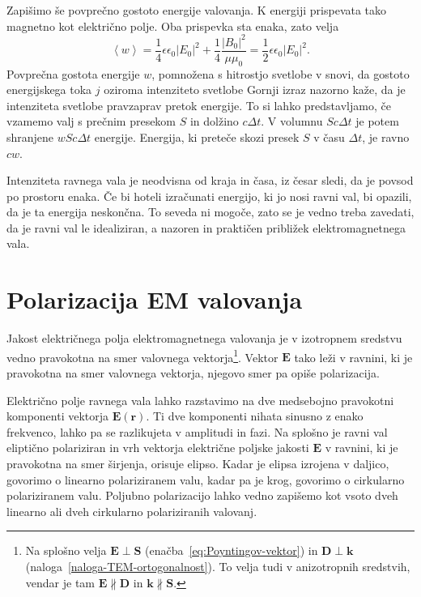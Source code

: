 Zapišimo še povprečno gostoto energije valovanja. 
K energiji prispevata tako magnetno kot električno polje. Oba prispevka sta enaka, zato velja
\begin{equation}
\left\langle w\right\rangle =\frac{1}{4}\epsilon\epsilon_{0}\left|E_{0}\right|^{2}+
\frac{1}{4}\frac{\left|B_{0}\right|^{2}}{\mu\mu_{0}}=\frac{1}{2}\epsilon\epsilon_{0}\left|E_{0}\right|^{2}.
\end{equation}
Povprečna gostota energije $w$, pomnožena s hitrostjo svetlobe v
snovi, da gostoto energijskega toka $j$ oziroma intenziteto 
svetlobe
Gornji izraz nazorno kaže, da je intenziteta svetlobe pravzaprav pretok
energije. To si lahko predstavljamo, če vzamemo valj s prečnim presekom
$S$ in dolžino $c\Delta t$. V volumnu $Sc\Delta t$ je potem shranjene $wSc\Delta t$
energije. Energija, ki preteče skozi presek $S$ v času $\Delta t$,
je ravno $cw$. 

Intenziteta ravnega vala je neodvisna od kraja in časa, iz česar sledi,
da je povsod po prostoru enaka. Če bi hoteli izračunati energijo,
ki jo nosi ravni val, bi opazili, da je ta energija neskončna. To
seveda ni mogoče, zato se je vedno treba zavedati, da je ravni val
le idealiziran, a nazoren in praktičen približek elektromagnetnega
vala.

\section{Polarizacija EM valovanja}
Jakost električnega polja elektromagnetnega valovanja je v izotropnem
sredstvu vedno pravokotna na smer valovnega vektorja\footnote{Na splošno 
velja $\mathbf{E}\perp\mathbf{S}$ (enačba~\ref{eq:Poyntingov-vektor}) in 
$\mathbf{D}\perp\mathbf{k}$ (naloga~\ref{naloga-TEM-ortogonalnost}). 
To velja tudi v anizotropnih sredstvih, vendar je tam $\mathbf{E} \nparallel 
\mathbf{D}$ in $\mathbf k\nparallel\mathbf S$.}. Vektor $\mathbf{E}$
tako leži v ravnini, ki je pravokotna na smer valovnega vektorja, njegovo
smer pa opiše polarizacija. 

Električno polje ravnega vala lahko razstavimo na dve medsebojno 
pravokotni komponenti vektorja $\mathbf{E}(\mathbf{r})$. Ti dve komponenti
nihata sinusno z enako frekvenco, lahko pa se razlikujeta v amplitudi in fazi. 
Na splošno je ravni val eliptično polariziran in
vrh vektorja električne poljske jakosti $\mathbf E$ v ravnini, ki je pravokotna 
na smer širjenja, orisuje elipso. Kadar je elipsa izrojena v daljico,
govorimo o linearno polariziranem valu,
kadar pa je krog, govorimo o cirkularno polariziranem valu. 
Poljubno polarizacijo lahko vedno zapišemo kot vsoto dveh linearno ali dveh 
cirkularno polariziranih valovanj. 

